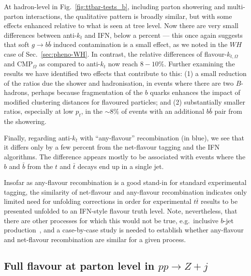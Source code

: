 \documentclass[nofootinbib,twocolumn,preprintnumbers,superscriptaddress,aps]{revtex4-2}
\newcommand{\logbook}[2]{}
\begin{document}
At hadron-level in Fig.~\ref{fig:ttbar-tests_b}, including parton showering and multi-parton
interactions, the qualitative pattern is broadly similar, but
with some effects enhanced relative to what is seen at tree level.
%
Now there are very small differences between anti-$k_t$ and 
IFN, below a percent --- this once again suggests that soft
$g \to b\bar b$ induced contamination is a small effect, as we noted
in the $WH$ case of Sec.~\ref{sec:pheno-WH}.
%
In contrast, the relative differences of flavour-$k_{t,\Omega}$ and CMP$_\Omega$ as
compared to anti-$k_t$ now reach $8{-}10\%$.
%
Further examining the results we have identified two effects that
contribute to this:
%
(1) a small reduction of the ratios due the shower and hadronisation,
in events where there are two $B$-hadrons, perhaps because
fragmentation of the $b$ quarks enhances the impact of modified
clustering distances for flavoured particles;
%
and (2) substantially smaller ratios, especially at low $p_t$, in the
$\sim 8\%$ of events with an additional $b\bar b$ pair from the
showering.
%
\logbook{c30d5df}{look at MC-tests/ttbar-results-2023-03-21/ttbar_2b_v_4b.pdf
  for further info.
  The $n_b$ fractions are a little hard to read exactly from there,
  but ``mergeidx.pl -f py8-rts13.6-allrseq.dat event.nb'' gives the
  bins and one gets $4-jet/all = 0.00145/0.0188 = 0.077$.
}
%


Finally, regarding anti-$k_t$ with ``any-flavour'' recombination
(in blue), we see that it differs only by a few percent from
the net-flavour tagging and the IFN algorithms.
%
The difference appears mostly to be associated with events where the
$b$ and $\bar b$ from the $t$ and $\bar t$ decays end up in a single
jet.
\logbook{167301ee9}{Look at figures/ttbar-tests-allalgs.pdf and note that with
  the $nbjet>=2$ requirement, at tree level, the difference goes away}
%
Insofar as any-flavour recombination is a good stand-in for standard
experimental tagging, the similarity of net-flavour and any-flavour
recombination indicates only limited need for unfolding corrections in order for
experimental $t\bar t$ results to be presented unfolded to an
IFN-style flavour truth level.
% 
%
Note, nevertheless, that there are other processes for which this
would not be true, e.g.\ inclusive $b$-jet
production~\cite{Banfi:2007gu}, and a case-by-case study is needed to
establish whether any-flavour and net-flavour recombination are
similar for a given process.
%



\subsection{Full flavour at parton level in $pp \to Z+j$}
\label{sec:pheno-Zj}
\end{document}
